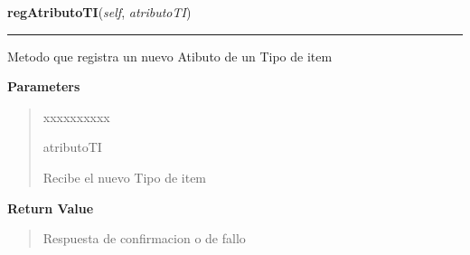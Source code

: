     \vspace{0.5ex}

\hspace{.8\funcindent}\begin{boxedminipage}{\funcwidth}

    \raggedright \textbf{regAtributoTI}(\textit{self}, \textit{atributoTI})

    \vspace{-1.5ex}

    \rule{\textwidth}{0.5\fboxrule}
\setlength{\parskip}{2ex}
    Metodo que registra un nuevo Atibuto de un Tipo de item

\setlength{\parskip}{1ex}
      \textbf{Parameters}
      \vspace{-1ex}

      \begin{quote}
        \begin{Ventry}{xxxxxxxxxx}

          \item[atributoTI]

          Recibe el nuevo Tipo de item

        \end{Ventry}

      \end{quote}

      \textbf{Return Value}
    \vspace{-1ex}

      \begin{quote}
      Respuesta de confirmacion o de fallo

      \end{quote}

    \end{boxedminipage}

    \label{app:controlador:contArchivo:ControllerAtributoTI:getAtributoTIId}

    \vspace{0.5ex}

